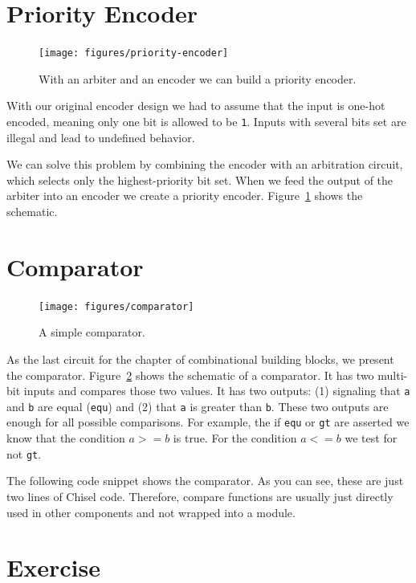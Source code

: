 \documentclass[%
    10pt,
    headinclude, footexclude,
    openright, %
    notitlepage,
    cleardoubleempty,
    headsepline,
    pointlessnumbers,
    bibtotoc, idxtotoc,
    ]{scrbook}
\newcommand{\code}[1]{{\small{\texttt{#1}}}}
\begin{document}
\section{Priority Encoder}


\begin{figure}
  \centering
  \texttt{[image: figures/priority-encoder]}
  \caption{With an arbiter and an encoder we can build a priority encoder.}
  \label{fig:priority-encoder}
\end{figure}

With our original encoder design we had to assume that the input is one-hot
encoded, meaning only one bit is allowed to be \code{1}. Inputs with several
bits set are illegal and lead to undefined behavior.

We can solve this problem by combining the encoder with an arbitration circuit, which selects only
the highest-priority bit set. When we feed the output of the arbiter into an encoder
we create a priority encoder.
Figure~\ref{fig:priority-encoder} shows the schematic.


\section{Comparator}

\begin{figure}
  \centering
  \texttt{[image: figures/comparator]}
  \caption{A simple comparator.}
  \label{fig:comparator}
\end{figure}

As the last circuit for the chapter of combinational building blocks, we present the comparator.
Figure~\ref{fig:comparator} shows the schematic of a comparator. It has two multi-bit inputs and
compares those two values. It has two outputs: (1) signaling that \code{a} and \code{b} are equal (\code{equ})
and (2) that \code{a} is greater than \code{b}. These two outputs are enough for all possible
comparisons. For example, the if \code{equ} or \code{gt} are asserted we know that the condition
$a >= b$ is true. For the condition $a <= b$ we test for not \code{gt}.

The following code snippet shows the comparator. As you can see, these are just two lines of
Chisel code. Therefore, compare functions are usually just directly used in other components and
not wrapped into a module.


\section{Exercise}
\end{document}
